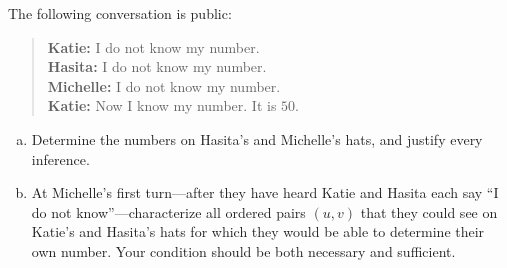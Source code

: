 \documentclass[11pt]{article}
\begin{document}
The following conversation is public:
\begin{quote}
\textbf{Katie:} I do not know my number.\\
\textbf{Hasita:} I do not know my number.\\
\textbf{Michelle:} I do not know my number.\\
\textbf{Katie:} Now I know my number. It is $50$.
\end{quote}

\begin{enumerate}[(a)]
    \item Determine the numbers on Hasita's and Michelle's hats, and justify every inference.

    \item At Michelle's first turn---after they have heard Katie and Hasita each say ``I do not know''---characterize all ordered pairs $(u,v)$ that they could see on Katie's and Hasita's hats for which they would be able to determine their own number. Your condition should be both necessary and sufficient.
\end{enumerate}
\end{document}
